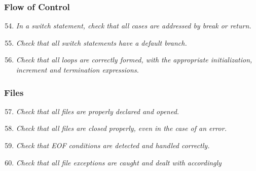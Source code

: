 	\subsubsection{Flow of Control}
		\begin{enumerate}
			\setcounter{enumi}{53}
			\item \textit{In a switch statement, check that all cases are addressed by break or return.}\newline

			\item \textit{Check that all switch statements have a default branch.}\newline

			\item \textit{Check that all loops are correctly formed, with the appropriate initialization, increment and termination expressions.}\newline

		\end{enumerate}

	\subsubsection{Files}
		\begin{enumerate}
			\setcounter{enumi}{56}
			\item \textit{Check that all files are properly declared and opened.}\newline

			\item \textit{Check that all files are closed properly, even in the case of an error.}\newline

			\item \textit{Check that EOF conditions are detected and handled correctly.}\newline

			\item \textit{Check that all file exceptions are caught and dealt with accordingly}\newline

		\end{enumerate}